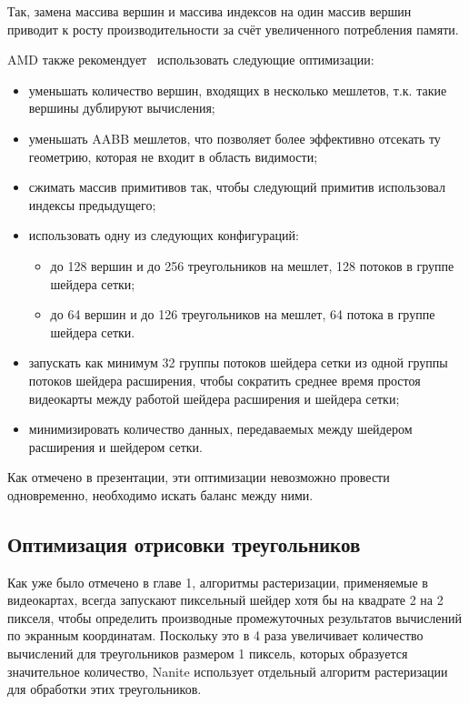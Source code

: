 Так, замена массива вершин и массива индексов на один массив вершин приводит к росту производительности за счёт увеличенного потребления памяти.

AMD также рекомендует~\cite{AMDMeshletsRecommendations} использовать следующие оптимизации:
\begin{itemize}
    \item уменьшать количество вершин, входящих в несколько мешлетов, т.к. такие вершины дублируют вычисления;
    \item уменьшать AABB мешлетов, что позволяет более эффективно отсекать ту геометрию, которая не входит в область видимости;
    \item сжимать массив примитивов так, чтобы следующий примитив использовал индексы предыдущего;
    \item использовать одну из следующих конфигураций:
    \begin{itemize}
        \item до 128 вершин и до 256 треугольников на мешлет, 128 потоков в группе шейдера сетки;
        \item до 64 вершин и до 126 треугольников на мешлет, 64 потока в группе шейдера сетки.
    \end{itemize}
    \item запускать как минимум 32 группы потоков шейдера сетки из одной группы потоков шейдера расширения, чтобы сократить среднее время простоя видеокарты между работой шейдера расширения и шейдера сетки;
    \item минимизировать количество данных, передаваемых между шейдером расширения и шейдером сетки.
\end{itemize}

Как отмечено в презентации, эти оптимизации невозможно провести одновременно, необходимо искать баланс между ними.

\subsection*{Оптимизация отрисовки треугольников}
Как уже было отмечено в главе 1, алгоритмы растеризации, применяемые в видеокартах, всегда запускают пиксельный шейдер хотя бы на квадрате 2 на 2 пикселя, чтобы определить производные промежуточных результатов вычислений по экранным координатам.
Поскольку это в 4 раза увеличивает количество вычислений для треугольников размером 1 пиксель, которых образуется значительное количество, Nanite использует отдельный алгоритм растеризации для обработки этих треугольников.


